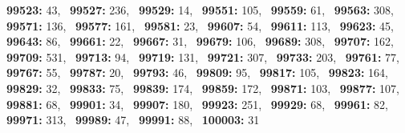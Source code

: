 \textbf{99523:} 43,\allowbreak~ 
\textbf{99527:} 236,\allowbreak~ 
\textbf{99529:} 14,\allowbreak~ 
\textbf{99551:} 105,\allowbreak~ 
\textbf{99559:} 61,\allowbreak~ 
\textbf{99563:} 308,\allowbreak~ 
\textbf{99571:} 136,\allowbreak~ 
\textbf{99577:} 161,\allowbreak~ 
\textbf{99581:} 23,\allowbreak~ 
\textbf{99607:} 54,\allowbreak~ 
\textbf{99611:} 113,\allowbreak~ 
\textbf{99623:} 45,\allowbreak~ 
\textbf{99643:} 86,\allowbreak~ 
\textbf{99661:} 22,\allowbreak~ 
\textbf{99667:} 31,\allowbreak~ 
\textbf{99679:} 106,\allowbreak~ 
\textbf{99689:} 308,\allowbreak~ 
\textbf{99707:} 162,\allowbreak~ 
\textbf{99709:} 531,\allowbreak~ 
\textbf{99713:} 94,\allowbreak~ 
\textbf{99719:} 131,\allowbreak~ 
\textbf{99721:} 307,\allowbreak~ 
\textbf{99733:} 203,\allowbreak~ 
\textbf{99761:} 77,\allowbreak~ 
\textbf{99767:} 55,\allowbreak~ 
\textbf{99787:} 20,\allowbreak~ 
\textbf{99793:} 46,\allowbreak~ 
\textbf{99809:} 95,\allowbreak~ 
\textbf{99817:} 105,\allowbreak~ 
\textbf{99823:} 164,\allowbreak~ 
\textbf{99829:} 32,\allowbreak~ 
\textbf{99833:} 75,\allowbreak~ 
\textbf{99839:} 174,\allowbreak~ 
\textbf{99859:} 172,\allowbreak~ 
\textbf{99871:} 103,\allowbreak~ 
\textbf{99877:} 107,\allowbreak~ 
\textbf{99881:} 68,\allowbreak~ 
\textbf{99901:} 34,\allowbreak~ 
\textbf{99907:} 180,\allowbreak~ 
\textbf{99923:} 251,\allowbreak~ 
\textbf{99929:} 68,\allowbreak~ 
\textbf{99961:} 82,\allowbreak~ 
\textbf{99971:} 313,\allowbreak~ 
\textbf{99989:} 47,\allowbreak~ 
\textbf{99991:} 88,\allowbreak~ 
\textbf{100003:} 31
